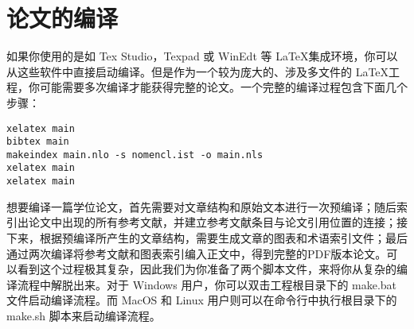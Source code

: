 \section{论文的编译}
\label{sec:compilation}

如果你使用的是如 Tex Studio，Texpad 或 WinEdt 等 \LaTeX 集成环境，你可以从这些软件中直接启动编译。但是作为一个较为庞大的、涉及多文件的 \LaTeX 工程，你可能需要多次编译才能获得完整的论文。一个完整的编译过程包含下面几个步骤：

\begin{tcolorbox}
\begin{lstlisting}
xelatex main
bibtex main
makeindex main.nlo -s nomencl.ist -o main.nls
xelatex main
xelatex main
\end{lstlisting}
\end{tcolorbox}

\noindent 想要编译一篇学位论文，首先需要对文章结构和原始文本进行一次预编译；随后索引出论文中出现的所有参考文献，并建立参考文献条目与论文引用位置的连接；接下来，根据预编译所产生的文章结构，需要生成文章的图表和术语索引文件；最后通过两次编译将参考文献和图表索引编入正文中，得到完整的PDF版本论文。可以看到这个过程极其复杂，因此我们为你准备了两个脚本文件，来将你从复杂的编译流程中解脱出来。对于 Windows 用户，你可以双击工程根目录下的 make.bat 文件启动编译流程。而 MacOS 和 Linux 用户则可以在命令行中执行根目录下的 make.sh 脚本来启动编译流程。